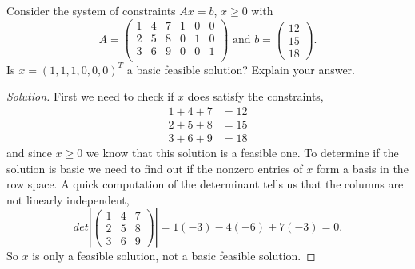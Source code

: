\documentclass[12pt]{article}
\makeatletter
\theoremstyle{homework}
\newenvironment{exercise}[1]
{\def\@currentlabel{#1}\exercisecore}
{\endexercisecore}
\makeatother
\begin{document}
\begin{exercise}{3.12} Consider the system of constraints $Ax = b$, $x \geq 0$ with 
  \begin{equation}
    A = \begin{pmatrix}
      1 &4 &7& 1& 0 &0 \\
      2 &5 &8& 0& 1 &0 \\
      3 &6 &9& 0& 0 &1 \\
    \end{pmatrix}
    \text{ and }
    b = \begin{pmatrix}
      12\\
      15\\
      18
    \end{pmatrix}.
  \end{equation}
  Is $x = (1, 1, 1, 0, 0, 0)^T$ a basic feasible solution? Explain your answer.
  \begin{proof}[Solution] First we need to check if $x$ does satisfy the constraints, 
    \begin{align*}
      1 + 4 + 7 &= 12\\
      2 + 5 + 8 &= 15\\
      3 + 6 + 9 &= 18
    \end{align*}
    and since $x \geq 0$ we know that this solution is a feasible one. 
    To determine if the solution is basic we need to find out if
    the nonzero entries of $x$ form a basis in the row space. 
    A quick computation of the determinant tells us that the columns are not 
    linearly independent, 
    \begin{equation*}
      det\left| \begin{pmatrix}
        1 &4 &7\\
        2 &5 &8\\
        3 &6 &9
      \end{pmatrix}\right| = 
      1\left(-3\right)-4\left(-6\right)+7\left(-3\right) = 0.
    \end{equation*}
    So $x$ is only a feasible solution, not a basic feasible solution. 
  \end{proof}
\end{exercise}
\vspace{.5in}
\end{document}
